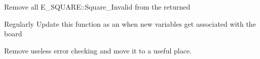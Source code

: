 
\begin{DoxyRefList}
\item[Member \mbox{\hyperlink{structS__BOARD_aee4e1de800c7deabd26e1d650e455744}{S\+\_\+\+BOARD\+::Get\+Square\+List}} (U8 piece)]\label{todo__todo000003}%
%
Remove all E\+\_\+\+SQUARE\+::\+Square\+\_\+\+Invalid from the returned  
\item[Member \mbox{\hyperlink{structS__BOARD_aa3633793b7953270f505a302ffc18e25}{S\+\_\+\+BOARD\+::Reset\+Board}} ()]\label{todo__todo000002}%
%
Regularly Update this function as an when new variables get associated with the board 
\item[Member \mbox{\hyperlink{structS__BOARD_ae71fdcf8a41f0b9bf7fd0f635595533b}{S\+\_\+\+BOARD\+::Set\+Piece\+On\+Square}} (U8 sq120, E\+\_\+\+PIECE piece)]\label{todo__todo000001}%
%
Remove useless error checking and move it to a useful place.
\end{DoxyRefList}